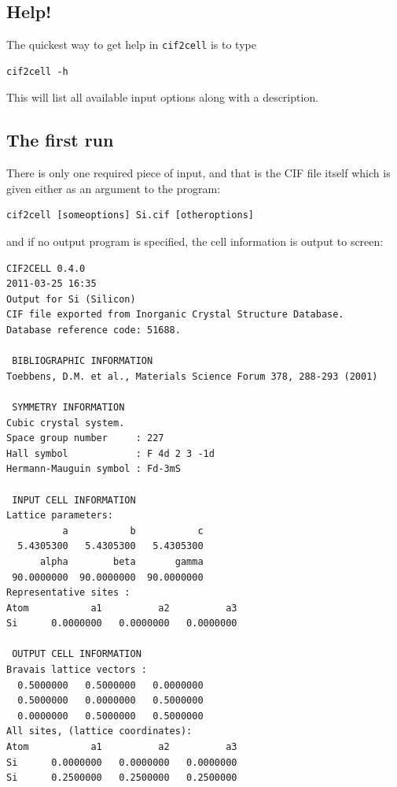 \documentclass[11pt]{article}
\newcommand{\ciftocell}{\texttt{cif2cell}}
\begin{document}
\subsection{Help!}
The quickest way to get help in \ciftocell{} is to type
\begin{verbatim}
cif2cell -h
\end{verbatim}
This will list all available input options along with a description.

\subsection{The first run}\label{firstrun}
There is only one required piece of input, and that is the CIF file itself which is given either as an argument to the program:
\begin{verbatim}
cif2cell [someoptions] Si.cif [otheroptions]
\end{verbatim}
and if no output program is specified, the cell information is output to screen:

\begin{verbatim}
CIF2CELL 0.4.0
2011-03-25 16:35
Output for Si (Silicon)
CIF file exported from Inorganic Crystal Structure Database.
Database reference code: 51688.

 BIBLIOGRAPHIC INFORMATION
Toebbens, D.M. et al., Materials Science Forum 378, 288-293 (2001) 

 SYMMETRY INFORMATION
Cubic crystal system.
Space group number     : 227
Hall symbol            : F 4d 2 3 -1d
Hermann-Mauguin symbol : Fd-3mS

 INPUT CELL INFORMATION
Lattice parameters:
          a           b           c 
  5.4305300   5.4305300   5.4305300 
      alpha        beta       gamma 
 90.0000000  90.0000000  90.0000000 
Representative sites :
Atom           a1          a2          a3 
Si      0.0000000   0.0000000   0.0000000

 OUTPUT CELL INFORMATION
Bravais lattice vectors :
  0.5000000   0.5000000   0.0000000 
  0.5000000   0.0000000   0.5000000 
  0.0000000   0.5000000   0.5000000 
All sites, (lattice coordinates):
Atom           a1          a2          a3 
Si      0.0000000   0.0000000   0.0000000
Si      0.2500000   0.2500000   0.2500000
\end{verbatim}
\end{document}
